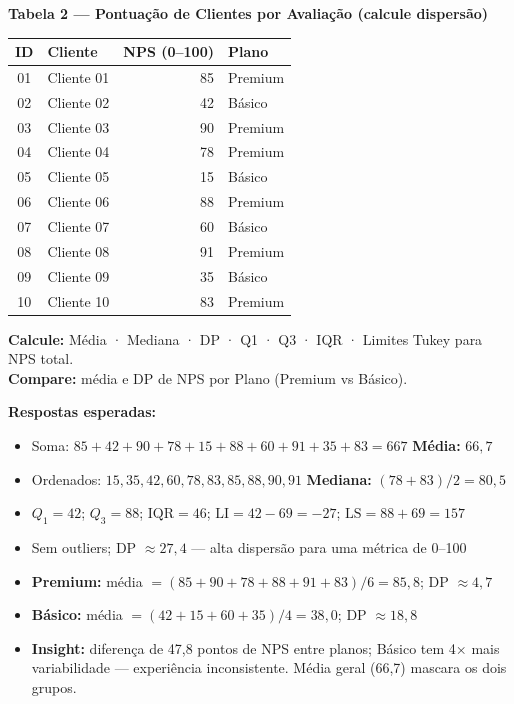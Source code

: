 \begin{BoardBox}
\textbf{Tabela 2 — Pontuação de Clientes por Avaliação (calcule dispersão)}

\medskip
\begin{tabular}{|c|l|r|l|}
\hline
\textbf{ID} & \textbf{Cliente} & \textbf{NPS (0–100)} & \textbf{Plano} \\
\hline
01 & Cliente 01 & 85 & Premium \\
02 & Cliente 02 & 42 & Básico  \\
03 & Cliente 03 & 90 & Premium \\
04 & Cliente 04 & 78 & Premium \\
05 & Cliente 05 & 15 & Básico  \\
06 & Cliente 06 & 88 & Premium \\
07 & Cliente 07 & 60 & Básico  \\
08 & Cliente 08 & 91 & Premium \\
09 & Cliente 09 & 35 & Básico  \\
10 & Cliente 10 & 83 & Premium \\
\hline
\end{tabular}

\smallskip
\textbf{Calcule:} Média · Mediana · DP · Q1 · Q3 · IQR · Limites Tukey para NPS total.\\
\textbf{Compare:} média e DP de NPS por Plano (Premium vs Básico).

\smallskip
\textbf{Respostas esperadas:}
\begin{itemize}
  \item Soma: $85+42+90+78+15+88+60+91+35+83 = 667$ \quad \textbf{Média:} $66{,}7$
  \item Ordenados: $15,35,42,60,78,83,85,88,90,91$ \quad \textbf{Mediana:} $(78+83)/2 = 80{,}5$
  \item $Q_1 = 42$; $Q_3 = 88$; $\text{IQR} = 46$; $\text{LI} = 42 - 69 = -27$; $\text{LS} = 88 + 69 = 157$
  \item Sem outliers; DP $\approx 27{,}4$ — alta dispersão para uma métrica de 0–100
  \item \textbf{Premium:} média $= (85+90+78+88+91+83)/6 = 85{,}8$; DP $\approx 4{,}7$
  \item \textbf{Básico:} média $= (42+15+60+35)/4 = 38{,}0$; DP $\approx 18{,}8$
  \item \textbf{Insight:} diferença de 47,8 pontos de NPS entre planos; Básico tem 4×
  mais variabilidade — experiência inconsistente. Média geral (66,7) mascara os dois grupos.
\end{itemize}
\end{BoardBox}

